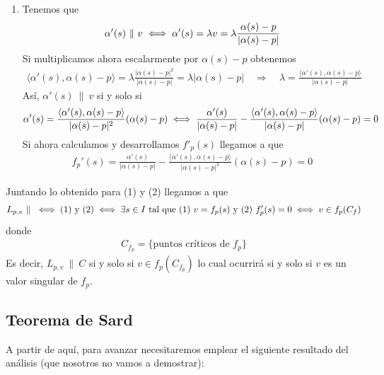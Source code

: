 \begin{observacion}
\begin{enumerate}[label=(\arabic*)]
        \item Tenemos que 
        \begin{gather*}
            \alpha'(s) \ \| \ v \iff \alpha'(s)=\lambda v = \lambda \frac{\alpha(s) - p}{|\alpha(s)-p|} 
        \end{gather*}
        Si multiplicamos ahora escalarmente por $\alpha(s) - p$ obtenemos
        \begin{gather*}
            \langle \alpha'(s), \alpha(s) - p \rangle = \lambda \frac{|\alpha(s)-p|^2}{|\alpha(s)-p|} = \lambda |\alpha(s)-p| \quad \Rightarrow \quad \lambda = \frac{\langle \alpha'(s), \alpha(s) - p \rangle}{|\alpha(s) - p|}
        \end{gather*}
        Así, $\alpha'(s) \ \| \ v$ si y solo si 
        \begin{gather*}
            \alpha'(s) = \frac{\langle \alpha'(s), \alpha(s) - p\rangle}{|\alpha(s) - p |^2}(\alpha(s)-p) \iff \frac{\alpha'(s)}{|\alpha(s) - p|} - \frac{\langle \alpha'(s), \alpha(s) - p\rangle}{|\alpha(s) - p|}(\alpha(s) -p) = 0
        \end{gather*}
        Si ahora calculamos y desarrollamos $f'_p(s)$ llegamos a que 
        \begin{gather*}
            f_p'(s) = \frac{\alpha'(s)}{|\alpha(s) - p|} - \frac{\langle \alpha'(s), \alpha(s) - p \rangle}{|\alpha(s) - p|^3}(\alpha(s) - p) = 0
        \end{gather*}
    \end{enumerate}
    Juntando lo obtenido para (1) y (2) llegamos a que 
    \begin{gather*}
        L_{p,v} \ \| \ \iff (1) \text{ y } (2) \iff \exists s \in I \text{ tal que (1) } v=f_p(s) \text{ y (2) } f_p'(s)=0 \iff v\in f_p(C_f)
    \end{gather*}
    donde
    \begin{gather*}
        C_{f_p}=\{\text{puntos críticos de $f_p$}\}
    \end{gather*}
    Es decir, $L_{p,v}\ \| \ C$ si y solo si $v\in f_p(C_{f_p})$ lo cual ocurrirá si y solo si $v$ es un valor singular de $f_p$.\\
\end{observacion}
\subsection{Teorema de Sard}
A partir de aquí, para avanzar necesitaremos emplear el siguiente resultado del análisis (que nosotros no vamos a demostrar):

